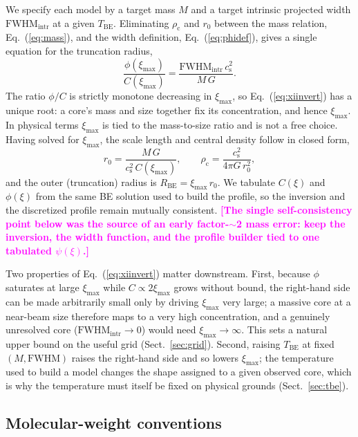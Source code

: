 \documentclass[11pt,a4paper]{article}
\newcommand{\note}[1]{\textcolor{magenta}{\textbf{[#1]}}}
\newcommand{\rhoc}{\rho_{\mathrm{c}}}
\newcommand{\cs}{c_{\mathrm{s}}}
\newcommand{\rzero}{r_{0}}
\newcommand{\Rbe}{R_{\mathrm{BE}}}
\newcommand{\Tbe}{T_{\mathrm{BE}}}
\newcommand{\ximax}{\xi_{\mathrm{max}}}
\begin{document}
We specify each model by a target mass $M$ and a target intrinsic projected
width $\mathrm{FWHM}_{\mathrm{intr}}$ at a given $\Tbe$. Eliminating $\rhoc$ and
$\rzero$ between the mass relation, Eq.~(\ref{eq:mass}), and the width
definition, Eq.~(\ref{eq:phidef}), gives a single equation for the truncation
radius,
\begin{equation}
  \frac{\phi(\ximax)}{C(\ximax)}
  = \frac{\mathrm{FWHM}_{\mathrm{intr}}\,\cs^{2}}{M\,G} .
  \label{eq:xiinvert}
\end{equation}
The ratio $\phi/C$ is strictly monotone decreasing in $\ximax$, so
Eq.~(\ref{eq:xiinvert}) has a unique root: a core's mass and size together fix
its concentration, and hence $\ximax$. In physical terms $\ximax$ is tied to
the mass-to-size ratio and is not a free choice. Having solved for $\ximax$,
the scale length and central density follow in closed form,
\begin{equation}
  \rzero = \frac{M\,G}{\cs^{2}\,C(\ximax)},
  \qquad
  \rhoc = \frac{\cs^{2}}{4\pi G\,\rzero^{2}},
  \label{eq:rho_from_MFW}
\end{equation}
and the outer (truncation) radius is $\Rbe=\ximax\,\rzero$. We tabulate
$C(\xi)$ and $\phi(\xi)$ from the same BE solution used to build the profile,
so the inversion and the discretized profile remain mutually consistent.
\note{The single self-consistency point below was the source of an early
factor-$\sim$2 mass error: keep the inversion, the width function, and the
profile builder tied to one tabulated $\psi(\xi)$.}

Two properties of Eq.~(\ref{eq:xiinvert}) matter downstream. First, because
$\phi$ saturates at large $\ximax$ while $C \propto 2\ximax$ grows without
bound, the right-hand side can be made arbitrarily small only by driving
$\ximax$ very large; a massive core at a near-beam size therefore maps to a
very high concentration, and a genuinely unresolved core
($\mathrm{FWHM}_{\mathrm{intr}} \to 0$) would need $\ximax \to \infty$. This
sets a natural upper bound on the useful grid (Sect.~\ref{sec:grid}). Second,
raising $\Tbe$ at fixed $(M,\mathrm{FWHM})$ raises the right-hand side and so
lowers $\ximax$; the temperature used to build a model changes the shape
assigned to a given observed core, which is why the temperature must itself be
fixed on physical grounds (Sect.~\ref{sec:tbe}).

\subsection{Molecular-weight conventions}
\label{sec:mu}
\end{document}
